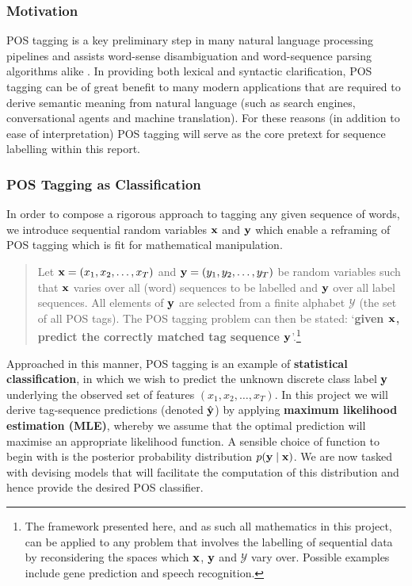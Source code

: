 \documentclass[../main.tex]{subfiles}
\begin{document}
\subsubsection{Motivation}
POS tagging is a key preliminary step in many natural language processing pipelines and assists word-sense disambiguation and word-sequence parsing algorithms alike \autocite{allen-nlu-1995}.
In providing both lexical and syntactic clarification, POS tagging can be of great benefit to many modern applications that are required to derive semantic meaning from natural language (such as search engines, conversational agents and machine translation).
For these reasons (in addition to ease of interpretation) POS tagging will serve as the core pretext for sequence labelling within this report.

\subsubsection{POS Tagging as Classification} \label{sec:pos-classification}

In order to compose a rigorous approach to tagging any given sequence of words, we introduce sequential random variables $\mathbf{x}$ and $\mathbf{y}$ which enable a reframing of POS tagging which is fit for mathematical manipulation.
\begin{quote}
Let $\mathbf{x} = (x_1,x_2,\ldots,x_T)$ and $\mathbf{y} = (y_1,y_2,\ldots,y_T)$ be random variables such that $\mathbf{x}$ varies over all (word) sequences to be labelled and $\mathbf{y}$ over all label sequences.
All elements of $\mathbf{y}$ are selected from a finite alphabet $\mathcal{Y}$ (the set of all POS tags).
The POS tagging problem can then be stated:
`\textbf{given $\mathbf{x}$, predict the correctly matched tag sequence $\mathbf{y}$}'.\footnote{The framework presented here, and as such all mathematics in this project, can be applied 
to any problem that involves the labelling of sequential data by reconsidering the spaces which $\mathbf{x}$, $\mathbf{y}$ and $\mathcal{Y}$ vary over. Possible examples include gene prediction and speech recognition.}
\end{quote}
Approached in this manner, POS tagging is an example of \textbf{statistical classification}, in which we wish to predict the unknown discrete class label $\mathbf{y}$ underlying the observed set of features $(x_1,x_2,\ldots,x_T)$.
In this project we will derive tag-sequence predictions (denoted $\hat{\mathbf{y}}$) by applying \textbf{maximum likelihood estimation (MLE)}, whereby we assume that the optimal prediction will maximise an appropriate likelihood function.
A sensible choice of function to begin with is the posterior probability distribution $p(\mathbf{y} \mid \mathbf{x})$.
We are now tasked with devising models that will facilitate the computation of this distribution and hence provide the desired POS classifier.
\end{document}
